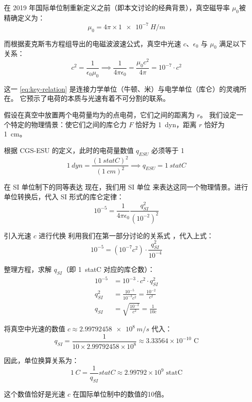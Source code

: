 \documentclass[12pt,a4paper,UTF8,fontset=lxgw]{ctexart}
\begin{document}
在 2019 年国际单位制重新定义之前（即本文讨论的经典背景），真空磁导率 $\mu_0$被精确定义为：
\begin{equation}
    \mu_0 = 4\pi \times \qty{1e-7}{H/m}
\end{equation}

而根据麦克斯韦方程组导出的电磁波波速公式，真空中光速 $c$、$\epsilon_0$ 与 $\mu_0$ 满足以下关系：
\begin{equation}
    c^2 = \frac{1}{\epsilon_0 \mu_0} \implies \frac{1}{4\pi \epsilon_0} = \frac{\mu_0 c^2}{4\pi} = 10^{-7} \cdot c^2\label{eq:key-relation}
\end{equation}

这一 \cref{eq:key-relation} 是连接力学单位（牛顿、米）与电学单位（库仑）的灵魂所在。
它预示了电荷的本质与光速有着不可分割的联系。

假设在真空中放置两个电荷量均为的点电荷，它们之间的距离为 $r$。
我们设定一个特定的物理情景：使它们之间的库仑力 $F$ 恰好为 \qty{1}{dyn}，距离 $r$ 恰好为 \qty{1}{cm}。

根据 CGS-ESU 的定义，此时的电荷量数值 $q_{ESU}$ 必须等于 1
\begin{equation}
    \qty{1}{dyn}= \frac{(\qty{1}{statC})^2}{(\qty{1}{cm})^2} \implies q_{ESU} = \qty{1}{statC}
\end{equation}

在 SI 单位制下的同等表达
现在，我们用 SI 单位 来表达这同一个物理情景。进行单位转换后，代入 SI 形式的库仑定律：
\begin{equation}
    10^{-5} = \frac{1}{4\pi \epsilon_0} \frac{q_{SI}^2}{(10^{-2})^2}
\end{equation}

引入光速 $c$ 进行代换
利用我们在第一部分讨论的关系式 ，代入上式：
\begin{equation}
    10^{-5} = (10^{-7} c^2) \cdot \frac{q_{SI}^2}{10^{-4}}
\end{equation}

整理方程，求解 $q_{SI}$（即 \qty{1}{statC} 对应的库仑数）：
\begin{equation}
    \begin{aligned}
        10^{-5} & = 10^{-3} \cdot c^2 \cdot q_{SI}^2 \\q_{SI}^2 &= \frac{10^{-5}}{10^{-3} c^2} = \frac{10^{-2}}{c^2} \\q_{SI} &= \sqrt{\frac{10^{-2}}{c^2}} = \frac{1}{10c}
    \end{aligned}
\end{equation}

将真空中光速的数值 $c \approx \qty{2.99792458e8}{m/s}$ 代入：
\begin{equation}
    q_{SI} = \frac{1}{10 \times 2.99792458 \times 10^8} \approx 3.33564 \times 10^{-10} \text{ C}
\end{equation}

因此，单位换算关系为：
\begin{equation}
    \qty{1}{C} = \frac{1}{q_{SI}} \unit{statC} \approx 2.99792 \times 10^9 \text{ statC}
\end{equation}

这个数值恰好是光速 $c$ 在国际单位制中的数值的10倍。

\printbibliography
\end{document}
